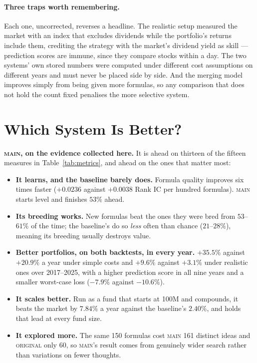 \documentclass[11pt]{article}
\newcommand{\main}{\textsc{main}}
\newcommand{\orig}{\textsc{original}}
\begin{document}
\paragraph{Three traps worth remembering.}
Each one, uncorrected, reverses a headline. The realistic setup measured the market
with an index that excludes dividends while the portfolio's returns include them,
crediting the strategy with the market's dividend yield as skill --- prediction scores
are immune, since they compare stocks within a day. The two systems' own stored numbers
were computed under different cost assumptions on different years and must never be
placed side by side. And the merging model improves simply from being given more
formulas, so any comparison that does not hold the count fixed penalises the more
selective system.

\section{Which System Is Better?}
\label{sec:verdict}

\textbf{\main{}, on the evidence collected here.} It is ahead on thirteen of the
fifteen measures in Table~\ref{tab:metrics}, and ahead on the ones that matter most:

\begin{itemize}[leftmargin=1.4em,itemsep=0.15em]
  \item \textbf{It learns, and the baseline barely does.} Formula quality improves six
        times faster ($+0.0236$ against $+0.0038$ Rank IC per hundred formulas). \main{}
        starts level and finishes $53\%$ ahead.
  \item \textbf{Its breeding works.} New formulas beat the ones they were bred from
        $53$--$61\%$ of the time; the baseline's do so \emph{less} often than chance
        ($21$--$28\%$), meaning its breeding usually destroys value.
  \item \textbf{Better portfolios, on both backtests, in every year.} $+35.5\%$ against
        $+20.9\%$ a year under simple costs and $+9.6\%$ against $+3.1\%$ under
        realistic ones over 2017--2025, with a higher prediction score in all nine years
        and a smaller worst-case loss ($-7.9\%$ against $-10.6\%$).
  \item \textbf{It scales better.} Run as a fund that starts at 100M and compounds, it
        beats the market by $7.84\%$ a year against the baseline's $2.40\%$, and holds
        that lead at every fund size.
  \item \textbf{It explored more.} The same 150 formulas cost \main{} 161 distinct ideas
        and \orig{} only 60, so \main{}'s result comes from genuinely wider search
        rather than variations on fewer thoughts.
\end{itemize}
\end{document}
